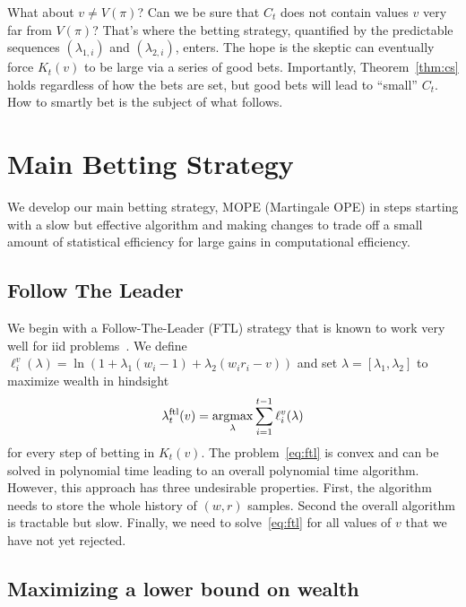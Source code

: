 What about $v \neq V(\pi)$? Can we be sure that $C_t$ does not contain values $v$ very far from $V(\pi)$? That's where the betting strategy, quantified by the predictable sequences $(\lambda_{1,i})$ and $(\lambda_{2,i})$, enters. The hope is the skeptic can eventually 
force $K_t(v)$ to be large via a series of good bets. 
Importantly, Theorem~\ref{thm:cs} holds regardless of how the bets are set,
but good bets will lead to ``small'' $C_t$.
How to smartly bet is the subject of what
follows.


\section{Main Betting Strategy}
We develop our main betting strategy, MOPE (Martingale OPE) 
in steps starting with a slow but effective algorithm 
and making changes to trade off a small amount of statistical
efficiency for large gains in computational efficiency.

\subsection{Follow The Leader}
We begin with a Follow-The-Leader
(FTL) strategy that is known 
to work very well for iid problems~\cite{de2014follow}.
We define $\ell_i^v(\lambda)=\ln(1+\lambda_1 (w_i-1)+\lambda_2(w_i r_i -
v))$ and set $\lambda = [\lambda_1, \lambda_2]$ to maximize 
wealth in
hindsight 
\begin{equation}
\lambda_{t}^{\textrm{ftl}}(v) = \operatorname*{argmax}_{\lambda} \sum_{i=1}^{t-1}
\ell_{i}^{v}(\lambda)
\label{eq:ftl}
\end{equation}
for every step of betting in $K_t(v)$.  
The problem~\eqref{eq:ftl} is convex and can be solved in
polynomial time leading to an overall polynomial time algorithm. 
However, this approach has three undesirable properties. 
First, the algorithm needs to store
the whole history of $(w,r)$ samples. 
Second the overall algorithm is
tractable but slow.  
Finally, we need to solve~\eqref{eq:ftl} for all
values of $v$ that we have not yet rejected.


\subsection{Maximizing a lower bound on wealth}


